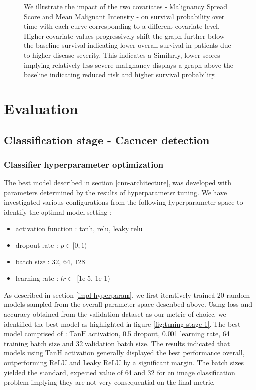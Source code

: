 \documentclass{l4proj}
\begin{document}
\begin{figure}[h]
    \caption{We illustrate the impact of the two covariates - Malignancy Spread Score and Mean Malignant Intensity - on survival probability over time with each curve corresponding to a different covariate level. Higher covariate values progressively shift the graph further below the baseline survival indicating lower overall survival in patients due to higher disease severity. This indicates a  Similarly, lower scores implying relatively less severe malignancy displays a graph above the baseline indicating reduced risk and higher survival probability.}
    \label{fig:KM-plot-result}
\end{figure}





\chapter{Evaluation} 
\section{Classification stage - Cacncer detection}
\subsection{Classifier hyperparameter optimization}
The best model described in section \ref{cnn-architecture}, was developed with parameters determined by the results of hyperparameter tuning. We have investigated various configurations from the following hyperparameter space to identify the optimal model setting :
\begin{itemize}
    \item  activation function : tanh, relu, leaky relu
    \item dropout rate : \(p \in [0, 1)\)
    \item batch size : 32, 64, 128
    \item learning rate : \(lr \in \) [1e-5, 1e-1)
\end{itemize}

As described in section \ref{impl-hyperparam}, we first iteratively trained 20 random models sampled from the overall parameter space described above. Using loss and accuracy obtained from the validation dataset as our metric of choice, we identified the best model as highlighted in figure \ref{fig:tuning-stage-1}. The best model comprised of : TanH activation, 0.5 dropout, 0.001 learning rate, 64 training batch size and 32 validation batch size. The results indicated that models using TanH activation generally displayed the best performance overall, outperforming ReLU and Leaky ReLU by a significant margin. The batch sizes yielded the standard, expected value of 64 and 32 for an image classification problem implying they are not very consequential on the final metric. 
\end{document}
